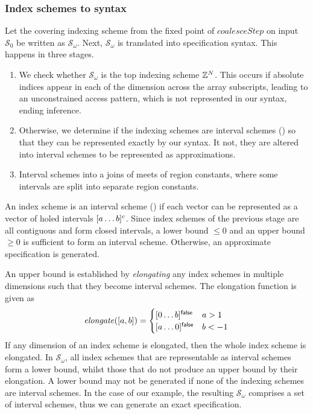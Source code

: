 \subsubsection{Index schemes to syntax}

\newcommand{\finalSet}{\mathcal{S}_\omega}
Let the covering indexing scheme from the fixed point of
$\mathit{coalesceStep}$ on input $\mathcal{S}_0$ be written as
$\finalSet{}$.  Next, $\finalSet{}$ is translated into specification
syntax. This happens in three stages.
%
\begin{enumerate}[leftmargin=2em]
  \item We check whether $\finalSet{}$
  is the top indexing scheme $\textnormal{$\mathbb{Z}$}{}^N$. This occurs if absolute indices
  appear in each of the dimension across the array subscripts,
  leading to an unconstrained access pattern, which is not represented
  in our syntax, ending inference.

  \item Otherwise, we determine if the indexing schemes are interval
  schemes () so that they can be represented
  exactly by our syntax. It not, they are altered into interval
  schemes to be represented as approximations.

  \item Interval schemes into a joins of meets
  of region constants, where some intervals are split into separate
  region constants.
\end{enumerate}
%
An index scheme is an interval scheme () if
each vector can be represented as a vector of holed intervals
$\textnormal{$\lbrack a\dots b\rbrack^{c}$}$.  Since index schemes of the previous stage are all
contiguous and form closed intervals, a lower bound $\leq 0$ and an
upper bound $\geq 0$ is sufficient to form an interval scheme.
Otherwise, an approximate specification is generated.

An upper bound is established by
\emph{elongating} any index schemes in multiple dimensions such that
they become interval schemes. The elongation function is
given as
%
\begin{align*}
  \mathit{elongate}([a,b]) = \begin{cases}
    \textnormal{$\lbrack0\dots b\rbrack^{\textsf{false}}$} & a > 1 \\
    \textnormal{$\lbrack a\dots0\rbrack^{\textsf{false}}$} & b < -1
  \end{cases}
\end{align*}
%
If any dimension of an index scheme is elongated, then the whole index
scheme is elongated. In $\finalSet$, all index schemes that are
representable as interval schemes form a lower bound, whilst those
that do not produce an upper bound by their elongation. A lower bound
may not be generated if none of the indexing schemes are interval schemes.
In the case of our example, the resulting $\finalSet$ comprises a set
of interval schemes, thus we can generate an exact specification.

